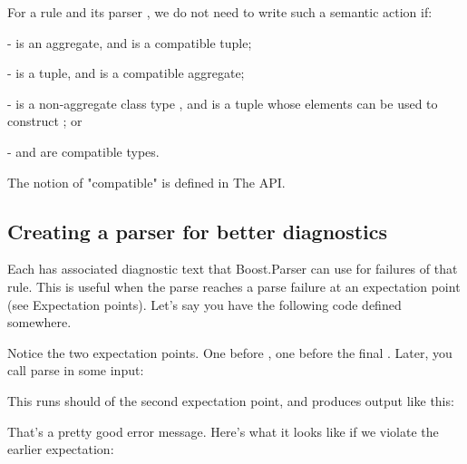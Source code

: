 \documentclass{MyBook}
\begin{document}
For a rule  and its parser , we do not need to write such a semantic action if:

- \emph{} is an aggregate, and \emph{} is a compatible tuple;

- \emph{} is a tuple, and \emph{} is a compatible aggregate;

- \emph{} is a non-aggregate class type , and \emph{} is a tuple whose elements can be used to construct ; or

- \emph{} and \emph{} are compatible types.

The notion of "compatible" is defined in The  API.

\subsection{Creating a parser for better diagnostics}

Each  has associated diagnostic text that Boost.Parser can use for failures of that rule. This is useful when the parse reaches a parse failure at an expectation point (see Expectation points). Let's say you have the following code defined somewhere.


Notice the two expectation points. One before , one before the final . Later, you call parse in some input:

\begin{code}
bp::parse("{ 4, 5 a", value, bp::ws);
\end{code}

This runs should of the second expectation point, and produces output like this:

\begin{code}
1:7: error: Expected '}' here:
{ 4, 5 a
       ^
\end{code}

That's a pretty good error message. Here's what it looks like if we violate the earlier expectation:
\end{document}
